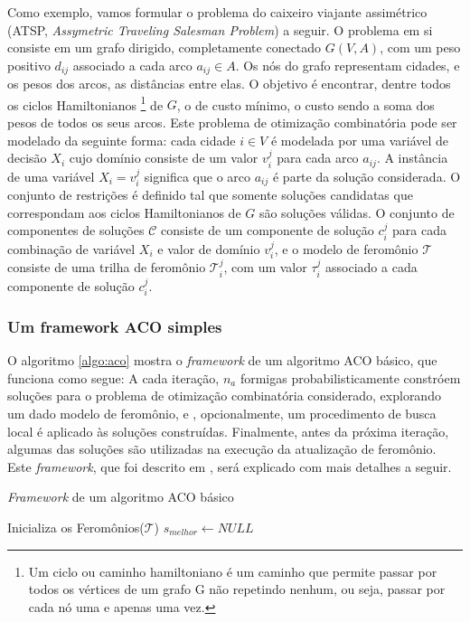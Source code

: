Como exemplo, vamos formular o problema do caixeiro viajante assimétrico
(ATSP,
\textit{Assymetric Traveling Salesman Problem}) a seguir. O problema em si
consiste em um grafo dirigido, completamente conectado $G(V, A)$, com um peso
positivo $d_{ij}$ associado a cada arco $a_{ij} \in A$. Os nós do grafo
representam cidades, e os pesos dos arcos, as distâncias entre elas. O objetivo
é encontrar, dentre todos os ciclos Hamiltonianos \footnote{Um ciclo ou caminho
hamiltoniano é um caminho que permite passar por todos os vértices de um grafo
G não repetindo nenhum, ou seja, passar por cada nó uma e apenas uma vez.} de
$G$, o de custo mínimo, o custo sendo a soma dos pesos de todos os seus arcos.
Este problema de otimização combinatória pode ser modelado da seguinte forma:
cada cidade $i \in V$ é modelada por uma variável de decisão $X_{i}$ cujo
domínio consiste de um valor $v_{i}^{j}$ para cada arco $a_{ij}$. A instância
de uma variável $X_{i} = v_{i}^{j}$ significa que o arco $a_{ij}$ é parte da
solução considerada. O conjunto de restrições é definido tal que somente
soluções candidatas que correspondam aos ciclos Hamiltonianos de $G$ são
soluções válidas. O conjunto de componentes de soluções $\mathcal{C}$ consiste
de um componente de solução $c_{i}^{j}$ para cada combinação de variável
$X_{i}$ e valor de domínio $v_{i}^{j}$, e o modelo de feromônio $\mathcal{T}$
consiste de uma trilha de feromônio $\mathcal{T}_{i}^{j}$, com um valor
$\tau_{i}^{j}$ associado a cada componente de solução $c_{i}^{j}$. 

\subsubsection{Um framework ACO simples}
O algoritmo \ref{algo:aco} mostra o \textit{framework} de um algoritmo ACO
básico, que funciona como segue: A cada iteração, $n_{a}$ formigas
probabilisticamente constróem soluções para o problema de otimização
combinatória considerado, explorando um dado modelo de feromônio, e
, opcionalmente, um procedimento de busca local é aplicado às soluções
construídas. Finalmente, antes da próxima iteração, algumas das soluções são
utilizadas na execução da atualização de feromônio. Este \textit{framework},
que foi descrito em \cite{dorigo2005ant}, será explicado com mais detalhes a
seguir.

\begin{algorithm}[h]
\label{algo:aco}
\caption{\textit{Framework} de um algoritmo ACO básico}
Inicializa os Feromônios($\mathcal{T}$)\;
$s_{melhor} \gets NULL$\;
\end{algorithm}

